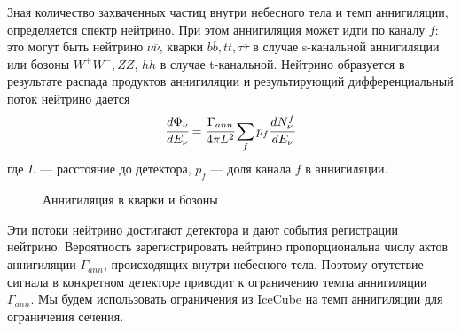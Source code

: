 Зная количество захваченных частиц внутри небесного тела и темп аннигиляции, определяется спектр нейтрино. При этом аннигиляция может идти по каналу $f$: это могут быть нейтрино $\nu\overline{\nu}$, кварки $b\overline{b}, t\overline{t}, \tau\overline{\tau}$ в случае s-канальной аннигиляции или бозоны $W^+W^-, ZZ$, $hh$ в случае t-канальной. Нейтрино образуется в результате распада продуктов аннигиляции и результирующий дифференциальный поток нейтрино дается \cite{CIRELLI2008338}
\begin{equation}
	\cfrac{d \Phi_{\nu}}{d E_{\nu}} = \cfrac{\Gamma_{ann}}{4\pi L^2} \sum_f{p_f \cfrac{d N^f_{\nu}}{d E_{\nu}}}
\end{equation}
где $L$ --- расстояние до детектора, $p_f$ --- доля канала $f$ в аннигиляции.

\begin{figure}[!h]
	\centering
	\begin{subfigure}[b!]{0.3\textwidth}
	\end{subfigure}
	\begin{subfigure}[b!]{0.2\textwidth}
	\end{subfigure}
	\caption {Аннигиляция в кварки и бозоны}
	\label{pic:ann_channels}
\end{figure}

Эти потоки нейтрино достигают детектора и дают события регистрации нейтрино. Вероятность зарегистрировать нейтрино пропорциональна числу актов аннигиляции $\Gamma_{ann}$, происходящих внутри небесного тела. Поэтому отутствие сигнала в конкретном детекторе приводит к ограничению темпа аннигиляции $\Gamma_{ann}$. 
Мы будем использовать ограничения из IceCube \cite{Aartsen_2017} на темп аннигиляции для ограничения сечения.


